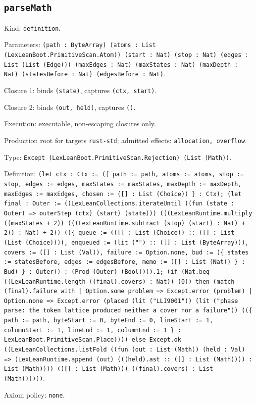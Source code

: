 \documentclass[11pt]{article}
\begin{document}
\subsection*{\texttt{parseMath}}
\noindent Kind: \texttt{definition}.\par
\noindent Parameters: \texttt{(path : ByteArray) (atoms : List (LexLeanBoot.PrimitiveScan.Atom)) (start : Nat) (stop : Nat) (edges : List (List (Edge))) (maxEdges : Nat) (maxStates : Nat) (maxDepth : Nat) (statesBefore : Nat) (edgesBefore : Nat)}.\par
\noindent Closure 1: binds \texttt{(state)}, captures \texttt{(ctx, start)}.\par
\noindent Closure 2: binds \texttt{(out, held)}, captures \texttt{()}.\par
\noindent Execution: executable, non-escaping closures only.\par
\noindent Production root for targets \texttt{rust-std}; admitted effects: \texttt{allocation, overflow}.\par
\noindent Type: \texttt{Except (LexLeanBoot.PrimitiveScan.Rejection) (List (Math))}.\par
\noindent Definition: \texttt{(let ctx : Ctx := (\{ path := path, atoms := atoms, stop := stop, edges := edges, maxStates := maxStates, maxDepth := maxDepth, maxEdges := maxEdges, chosen := ([] : List (Choice)) \} : Ctx); (let final : Outer := ((LexLeanCollections.iterateUntil ((fun (state : Outer) => outerStep (ctx) (start) (state))) (((LexLeanRuntime.multiply ((maxStates + 2)) (((LexLeanRuntime.subtract (stop) (start) : Nat) + 2)) : Nat) + 2)) ((\{ queue := (([] : List (Choice)) :: ([] : List (List (Choice)))), enqueued := (lit ("") :: ([] : List (ByteArray))), covers := ([] : List (Val)), failure := Option.none, bud := (\{ states := statesBefore, edges := edgesBefore, memo := ([] : List (Nat)) \} : Bud) \} : Outer)) : (Prod (Outer) (Bool)))).1; (if (Nat.beq ((LexLeanRuntime.length ((final).covers) : Nat)) (0)) then (match (final).failure with | Option.some problem => Except.error (problem) | Option.none => Except.error (placed (lit ("LLI9001")) (lit ("phase parse: the token lattice produced neither a cover nor a failure")) ((\{ path := path, byteStart := 0, byteEnd := 0, lineStart := 1, columnStart := 1, lineEnd := 1, columnEnd := 1 \} : LexLeanBoot.PrimitiveScan.Place)))) else Except.ok ((LexLeanCollections.listFold ((fun (out : List (Math)) (held : Val) => (LexLeanRuntime.append (out) (((held).ast :: ([] : List (Math)))) : List (Math)))) (([] : List (Math))) ((final).covers) : List (Math))))))}.\par
\noindent Axiom policy: \texttt{none}.\par
\end{document}
